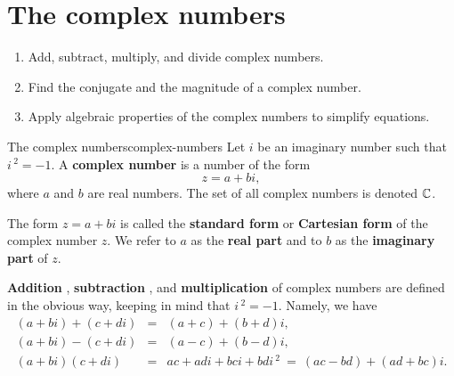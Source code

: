 \section{The complex numbers}

\begin{outcome}
  \begin{enumerate}
  \item Add, subtract, multiply, and divide complex numbers.
  \item Find the conjugate and the magnitude of a complex number.
  \item Apply algebraic properties of the complex numbers to simplify
    equations.
  \end{enumerate}
\end{outcome}

\begin{definition}{The complex numbers}{complex-numbers}
  Let $i$ be an imaginary number such that $i\,^2=-1$. A \textbf{complex
    number}%
   is a number of the form
  \begin{equation*}
    z = a + bi,
  \end{equation*}
  where $a$ and $b$ are real numbers. The set of all complex numbers
  is denoted $\mathbb{C}$.
\end{definition}

The form $z = a+bi$ is called the \textbf{standard form}%
%
 or \textbf{Cartesian form}%
%
 of the complex number $z$.
We refer to $a$ as the \textbf{real part}%
%
 and to $b$ as the
\textbf{imaginary part}%
%
 of $z$.

\textbf{Addition}%
%
, \textbf{subtraction}%
%
, and \textbf{multiplication}%
%
 of complex numbers are
defined in the obvious way, keeping in mind that $i\,^2=-1$. Namely, we
have
\begin{eqnarray*}
  (a+bi) + (c+di) &=& (a+c) + (b+d)i, \\
  (a+bi) - (c+di) &=& (a-c) + (b-d)i, \\
  (a+bi) (c+di)   &=& ac+adi+bci+bdi\,^2 ~=~ (ac-bd) + (ad + bc)i.
\end{eqnarray*}

